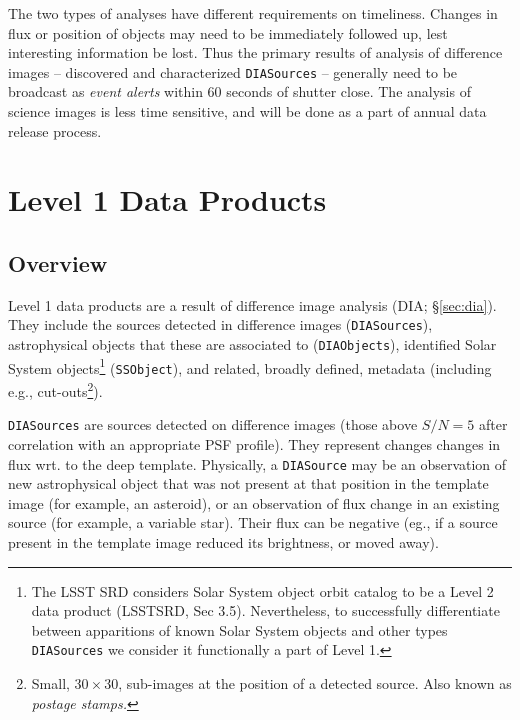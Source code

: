 \documentclass[12pt]{article}
\newcommand{\code}[1]{\texttt{#1}}
\newcommand{\DIASource}{\code{DIASource}\xspace}
\newcommand{\DIASources}{\code{DIASources}\xspace}
\newcommand{\DIAObjects}{\code{DIAObjects}\xspace}
\newcommand{\SSObject}{\code{SSObject}\xspace}
\begin{document}
The two types of analyses have different requirements on timeliness. Changes in flux or position of objects may need to be immediately followed up, lest interesting information be lost. Thus the primary results of analysis of difference images -- discovered and characterized \DIASources{} -- generally need to be broadcast as {\em event alerts} within 60 seconds of shutter close. The analysis of science images is less time sensitive, and will be done as a part of annual data release process.




\section{Level 1 Data Products}

\subsection{Overview}

Level 1 data products are a result of difference image analysis (DIA; \S \ref{sec:dia}). They include the sources detected in difference images (\DIASources), astrophysical objects that these are associated to (\DIAObjects), identified Solar System objects\footnote{The LSST SRD considers Solar System object orbit catalog to be a Level 2 data product (LSSTSRD, Sec 3.5). Nevertheless, to successfully differentiate between apparitions of known Solar System objects and other types \DIASources we consider it functionally a part of Level 1.} (\SSObject), and related, broadly defined, metadata (including e.g., cut-outs\footnote{Small, $30 \times 30$, sub-images at the position of a detected source. Also known as {\em postage stamps.}}).

\DIASources are sources detected on difference images (those above $S/N=5$ after correlation with an appropriate PSF profile). They represent changes changes in flux wrt. to the deep template. Physically, a \DIASource may be an observation of new astrophysical object that was not present at that position in the template image (for example, an asteroid), or an observation of flux change in an existing source (for example, a variable star). Their flux can be negative (eg., if a source present in the template image reduced its brightness, or moved away).
\end{document}
